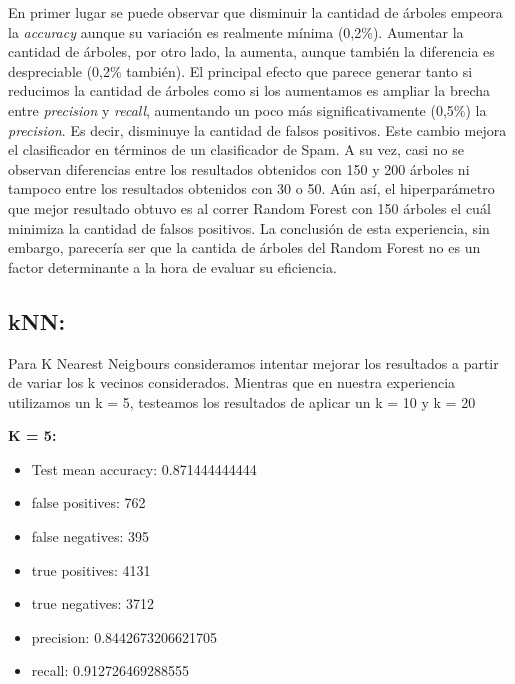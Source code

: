 \documentclass[10pt,a4paper]{article}
\begin{document}
En primer lugar se puede observar que disminuir la cantidad de árboles empeora la \textit{accuracy} aunque su variación es realmente mínima (0,2\%). Aumentar la cantidad de árboles, por otro lado, la aumenta, aunque también la diferencia es despreciable (0,2\% también). El principal efecto que parece generar tanto si reducimos la cantidad de árboles como si los aumentamos es ampliar la brecha entre \textit{precision} y \textit{recall}, aumentando un poco más significativamente (0,5\%) la \textit{precision}. Es decir, disminuye la cantidad de falsos positivos. Este cambio mejora el clasificador en términos de un clasificador de Spam.
A su vez, casi no se observan diferencias entre los resultados obtenidos con 150 y 200 árboles ni tampoco entre los resultados obtenidos con 30 o 50. Aún así, el hiperparámetro que mejor resultado obtuvo es al correr Random Forest con 150 árboles el cuál minimiza la cantidad de falsos positivos.
La conclusión de esta experiencia, sin embargo, parecería ser que la cantida de árboles del Random Forest no es un factor determinante a la hora de evaluar su eficiencia.


\subsection{kNN:}

Para K Nearest Neigbours consideramos intentar mejorar los resultados a partir de variar los k vecinos considerados. Mientras que en nuestra experiencia utilizamos un k = 5, testeamos los resultados de aplicar un k = 10 y k = 20

\textbf{K = 5:}
\begin{itemize}
	\item Test mean accuracy: 0.871444444444
	\item false positives: 762
	\item false negatives: 395
	\item true positives:  4131
	\item true negatives:  3712
	\item precision: 0.8442673206621705
	\item recall: 0.912726469288555
\end{itemize}
\end{document}
